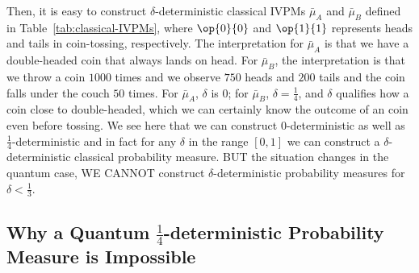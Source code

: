 \documentclass[english,reprint, aps, prl,superscriptaddress, showpacs,
showkeys, longbibliography, amsmath, amssymb, floatfix]{revtex4-1}
\theoremstyle{plain}
\theoremstyle{definition}
\newcommand{\proj}[1]{\op{#1}{#1}}
\begin{document}
\noindent Then, it is easy to construct $\delta$-deterministic classical
IVPMs $\bar{\mu}_{A}$ and $\bar{\mu}_{B}$ defined in Table~\ref{tab:classical-IVPMs},
where $\proj{0}$ and $\proj{1}$ represents heads and tails in coin-tossing,
respectively. The interpretation for $\bar{\mu}_{A}$ is that we have
a double-headed coin that always lands on head. For $\bar{\mu}_{B}$,
the interpretation is that we throw a coin $1000$ times and we observe
$750$ heads and $200$ tails and the coin falls under the couch $50$
times. For $\bar{\mu}_{A}$, $\delta$ is $0$; for $\bar{\mu}_{B}$,
$\delta=\frac{1}{4}$, and $\delta$ qualifies how a coin close to
double-headed, which we can certainly know the outcome of an coin
even before tossing. We see here that we can construct $0$-deterministic
as well as $\frac{1}{4}$-deterministic and in fact for any $\delta$
in the range $\left[0,1\right]$ we can construct a $\delta$-deterministic
classical probability measure. BUT the situation changes in the quantum
case, WE CANNOT construct $\delta$-deterministic probability measures
for $\delta<\frac{1}{3}$.

\subsection{Why a Quantum $\frac{1}{4}$-deterministic Probability Measure is
Impossible}
\end{document}
